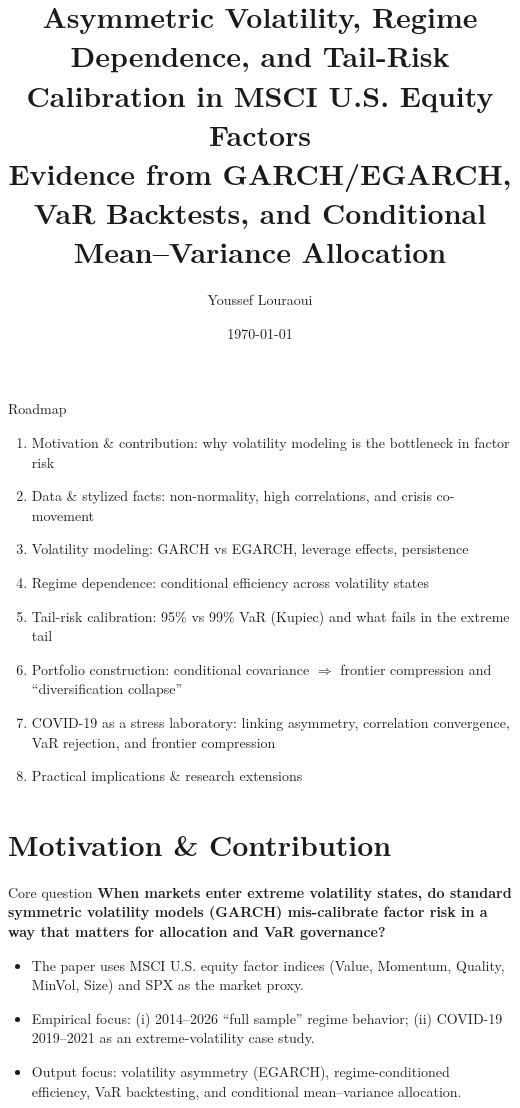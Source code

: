 \documentclass[10pt,aspectratio=169]{beamer}
\title{Asymmetric Volatility, Regime Dependence, and Tail-Risk Calibration in MSCI U.S. Equity Factors\\\vspace{2mm}\large Evidence from GARCH/EGARCH, VaR Backtests, and Conditional Mean--Variance Allocation}
\author{Youssef Louraoui}
\institute{youssef.louraoui@essec.edu}
\date{\today}
\newcommand{\sm}{\small}
\begin{document}
\begin{frame}
  \titlepage
\end{frame}

\begin{frame}{Roadmap}
\sm
\begin{enumerate}
  \item Motivation \& contribution: why volatility modeling is the bottleneck in factor risk
  \item Data \& stylized facts: non-normality, high correlations, and crisis co-movement
  \item Volatility modeling: GARCH vs EGARCH, leverage effects, persistence
  \item Regime dependence: conditional efficiency across volatility states
  \item Tail-risk calibration: 95\% vs 99\% VaR (Kupiec) and what fails in the extreme tail
  \item Portfolio construction: conditional covariance \(\Rightarrow\) frontier compression and ``diversification collapse''
  \item COVID-19 as a stress laboratory: linking asymmetry, correlation convergence, VaR rejection, and frontier compression
  \item Practical implications \& research extensions
\end{enumerate}
\end{frame}

\section{Motivation \& Contribution}

\begin{frame}{Core question}
\sm
\textbf{When markets enter extreme volatility states, do standard symmetric volatility models (GARCH) mis-calibrate factor risk in a way that matters for allocation and VaR governance?}

\vspace{2mm}
\begin{itemize}
  \item The paper uses MSCI U.S. equity factor indices (Value, Momentum, Quality, MinVol, Size) and SPX as the market proxy.
  \item Empirical focus: (i) 2014--2026 ``full sample'' regime behavior; (ii) COVID-19 2019--2021 as an extreme-volatility case study.
  \item Output focus: volatility asymmetry (EGARCH), regime-conditioned efficiency, VaR backtesting, and conditional mean--variance allocation.
\end{itemize}
\end{frame}
\end{document}
